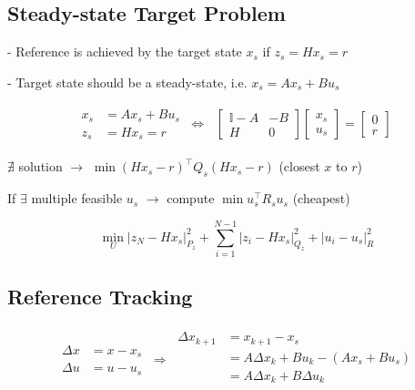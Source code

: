 
\subsection{Steady-state Target Problem}

- Reference is achieved by the target
state $x_s$ if $z_s = Hx_s = r$

- Target state should be a steady-state,
i.e. $x_s = Ax_s + Bu_s$

\begin{align*}
	\begin{aligned}
		x_s & = Ax_s + Bu_s \\
		z_s & = Hx_s = r
	\end{aligned}
	\ \Longleftrightarrow \
	\begin{aligned}
		\begin{bmatrix}
			\mathbb{I} - A & -B \\
			H              & 0
		\end{bmatrix}
		\begin{bmatrix}
			x_s \\
			u_s
		\end{bmatrix}
		=
		\begin{bmatrix}
			0 \\
			r
		\end{bmatrix}
	\end{aligned}
\end{align*}

$\nexists$ solution
$\rightarrow$
$\min (Hx_s - r)^\top Q_s (H x_s - r)$
(closest $x$ to $r$)

If $\exists$ multiple feasible $u_s$
$\rightarrow$
compute
$\min u_s^\top R_s u_s$
(cheapest)

$$
	\min_U |z_N - Hx_s|_{P_z}^2
	+ \sum_{i=1}^{N-1} | z_i - Hx_s |_{Q_z}^2
	+ | u_i - u_s |_{R}^2
$$

\subsection{Reference Tracking}

\begin{align*}
	\begin{aligned}
		\Delta x & = x - x_s
		\\
		\Delta u & = u - u_s
	\end{aligned}
	\ \Rightarrow \
	\begin{aligned}
		\Delta x_{k+1}
		 & = x_{k+1} -x_s                          \\
		 & = A\Delta x_k + B u_k - (A x_s + B u_s) \\
		 & = A\Delta x_k + B\Delta u_k             \\
	\end{aligned}
\end{align*}

